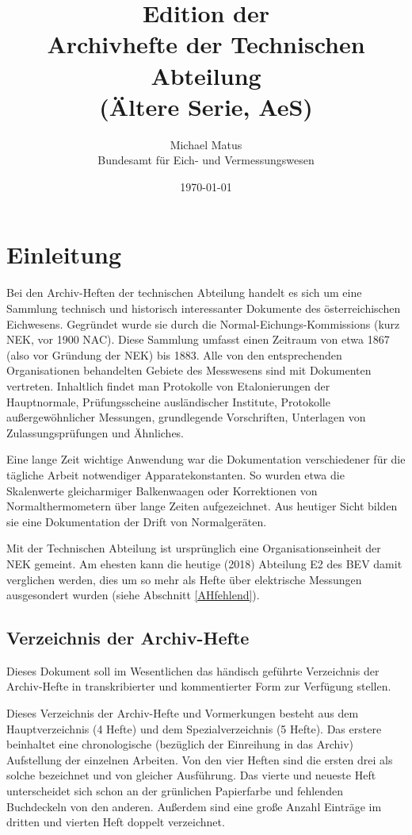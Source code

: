 \documentclass[a4paper]{scrbook}
\title{Edition der\\Archivhefte der Technischen Abteilung\\(Ältere Serie, AeS)}
\date{\today}
\author{Michael Matus \\ Bundesamt für Eich- und Vermessungswesen}
\begin{document}
\maketitle
\tableofcontents

\parindent0pt

\chapter{Einleitung}

Bei den \glqq Archiv-Heften der technischen Abteilung\grqq{} handelt es sich um eine Sammlung technisch und historisch interessanter Dokumente des öster\-reichi\-schen Eichwesens. Gegründet wurde sie durch die Normal-Eichungs-Komm\-iss\-ions (kurz NEK, vor 1900 NAC). Diese Sammlung umfasst einen Zeitraum von etwa 1867 (also vor Gründung der NEK) bis 1883. Alle von den entsprechenden Organisationen behandelten Gebiete des Messwesens sind mit Dokumenten vertreten. Inhaltlich findet man Protokolle von Etalonierungen der Hauptnormale, Prüfungsscheine ausländischer Institute, Protokolle außergewöhnlicher Messungen, grundlegende Vorschriften, Unterlagen von Zulassungsprüfungen und Ähnliches.

Eine lange Zeit wichtige Anwendung war die Dokumentation verschiedener für die tägliche Arbeit notwendiger Apparatekonstanten. So wurden etwa die Skalenwerte gleicharmiger Balkenwaagen oder Korrektionen von Normalthermometern über lange Zeiten aufgezeichnet. Aus heutiger Sicht bilden sie eine Dokumentation der Drift von Normalgeräten.

Mit der \glqq Technischen Abteilung\grqq{} ist ursprünglich eine Organisationseinheit der NEK gemeint. Am ehesten kann die heutige (2018) Abteilung E2 des BEV damit verglichen werden, dies um so mehr als Hefte über elektrische Messungen ausgesondert wurden (siehe Abschnitt \ref{AHfehlend}).

\section{Verzeichnis der Archiv-Hefte}

Dieses Dokument soll im Wesentlichen das händisch geführte Verzeichnis der Archiv-Hefte in transkribierter und kommentierter Form zur Verfügung stellen. 

Dieses \glqq Verzeichnis der Archiv-Hefte und Vormerkungen\grqq{} besteht aus dem \glqq Hauptverzeichnis\grqq{} (4 Hefte) und dem \glqq{}Spezialverzeichnis\grqq{} (5 Hefte). Das erstere beinhaltet eine chronologische (bezüglich der Einreihung in das Archiv) Aufstellung der einzelnen Arbeiten. Von den vier Heften sind die ersten drei als solche bezeichnet und von gleicher Ausführung. Das vierte und neueste Heft unterscheidet sich schon an der grünlichen Papierfarbe und fehlenden Buchdeckeln von den anderen. Außerdem sind eine große Anzahl Einträge im dritten und vierten Heft doppelt verzeichnet. 
\end{document}
